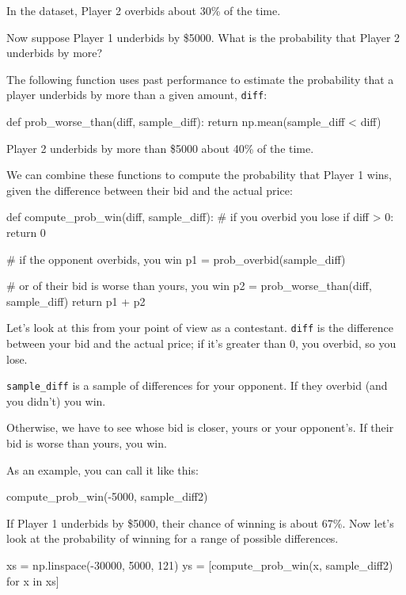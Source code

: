 \documentclass[12pt]{book}
\theoremstyle{exercise}
\newcommand{\py}[1]{{\tt #1}}%
\begin{document}
In the dataset, Player 2 overbids about 30\% of the time.

Now suppose Player 1 underbids by \$5000.
What is the probability that Player 2 underbids by more?

The following function uses past performance to estimate the probability that a player underbids by more than a given amount, \py{diff}:

\begin{code}
def prob_worse_than(diff, sample_diff):
    return np.mean(sample_diff < diff)
\end{code}

Player 2 underbids by more than \$5000 about 40\% of the time.

We can combine these functions to compute the probability that Player 1 wins, given the difference between their bid and the actual price:

\begin{code}
def compute_prob_win(diff, sample_diff):
    # if you overbid you lose
    if diff > 0:
        return 0

    # if the opponent overbids, you win
    p1 = prob_overbid(sample_diff)

    # or of their bid is worse than yours, you win
    p2 = prob_worse_than(diff, sample_diff)
    return p1 + p2
\end{code}

Let's look at this from your point of view as a contestant.
\py{diff} is the difference between your bid and the actual price; if it's greater than 0, you overbid, so you lose.

\py{sample_diff} is a sample of differences for your opponent.
If they overbid (and you didn't) you win.

Otherwise, we have to see whose bid is closer, yours or your opponent's.  If their bid is worse than yours, you win.

As an example, you can call it like this:

\begin{code}
compute_prob_win(-5000, sample_diff2)
\end{code}

If Player 1 underbids by \$5000, their chance of winning is about 67\%.
Now let's look at the probability of winning for a range of possible differences.

\begin{code}
xs = np.linspace(-30000, 5000, 121)
ys = [compute_prob_win(x, sample_diff2) for x in xs]
\end{code}
\end{document}
